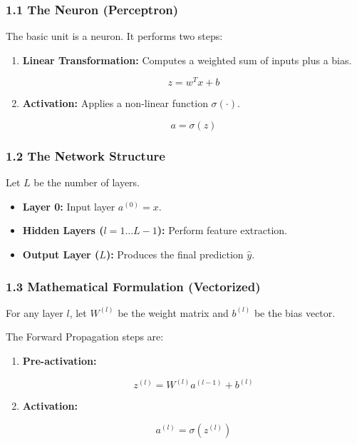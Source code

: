 \documentclass[
  italian,
  11pt,
]{article}
\begin{document}
\subsubsection{1.1 The Neuron (Perceptron)}\label{the-neuron-perceptron}

The basic unit is a neuron. It performs two steps:

\begin{enumerate}
\def\labelenumi{\arabic{enumi}.}
\item
  \textbf{Linear Transformation:} Computes a weighted sum of inputs plus
  a bias.

  \[z = w^T x + b\]
\item
  \textbf{Activation:} Applies a non-linear function \(\sigma(\cdot)\).

  \[a = \sigma(z)\]
\end{enumerate}

\subsubsection{1.2 The Network Structure}\label{the-network-structure}

Let \(L\) be the number of layers.

\begin{itemize}
\item
  \textbf{Layer 0:} Input layer \(a^{(0)} = x\).
\item
  \textbf{Hidden Layers (\(l = 1 \dots L-1\)):} Perform feature
  extraction.
\item
  \textbf{Output Layer (\(L\)):} Produces the final prediction
  \(\hat{y}\).
\end{itemize}

\subsubsection{1.3 Mathematical Formulation
(Vectorized)}\label{mathematical-formulation-vectorized}

For any layer \(l\), let \(W^{(l)}\) be the weight matrix and
\(b^{(l)}\) be the bias vector.

The Forward Propagation steps are:

\begin{enumerate}
\def\labelenumi{\arabic{enumi}.}
\item
  \textbf{Pre-activation:}

  \[z^{(l)} = W^{(l)} a^{(l-1)} + b^{(l)}\]
\item
  \textbf{Activation:}

  \[a^{(l)} = \sigma(z^{(l)})\]
\end{enumerate}
\end{document}
